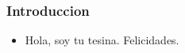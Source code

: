 \begin{frame}
	\frametitle{Introduccion}
	\begin{itemize}
		\item Hola, soy tu tesina. Felicidades.
	\end{itemize}
\end{frame}
